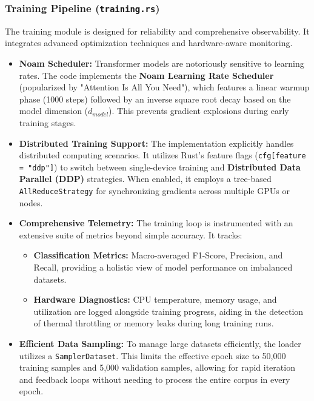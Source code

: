 \documentclass{ieeeaccess}
\begin{document}
\subsubsection{Training Pipeline (\texttt{training.rs})}
The training module is designed for reliability and comprehensive observability. It integrates advanced optimization techniques and hardware-aware monitoring.
\begin{itemize}
    \item \textbf{Noam Scheduler:} Transformer models are notoriously sensitive to learning rates. The code implements the \textbf{Noam Learning Rate Scheduler} (popularized by "Attention Is All You Need"), which features a linear warmup phase (1000 steps) followed by an inverse square root decay based on the model dimension ($d_{model}$). This prevents gradient explosions during early training stages.
    
    \item \textbf{Distributed Training Support:} The implementation explicitly handles distributed computing scenarios. It utilizes Rust's feature flags (\texttt{cfg[feature = "ddp"]}) to switch between single-device training and \textbf{Distributed Data Parallel (DDP)} strategies. When enabled, it employs a tree-based \texttt{AllReduceStrategy} for synchronizing gradients across multiple GPUs or nodes.
    
    \item \textbf{Comprehensive Telemetry:} The training loop is instrumented with an extensive suite of metrics beyond simple accuracy. It tracks:
    \begin{itemize}
        \item \textbf{Classification Metrics:} Macro-averaged F1-Score, Precision, and Recall, providing a holistic view of model performance on imbalanced datasets.
        \item \textbf{Hardware Diagnostics:} CPU temperature, memory usage, and utilization are logged alongside training progress, aiding in the detection of thermal throttling or memory leaks during long training runs.
    \end{itemize}
    
    \item \textbf{Efficient Data Sampling:} To manage large datasets efficiently, the loader utilizes a \texttt{SamplerDataset}. This limits the effective epoch size to 50,000 training samples and 5,000 validation samples, allowing for rapid iteration and feedback loops without needing to process the entire corpus in every epoch.
\end{itemize}
\end{document}
